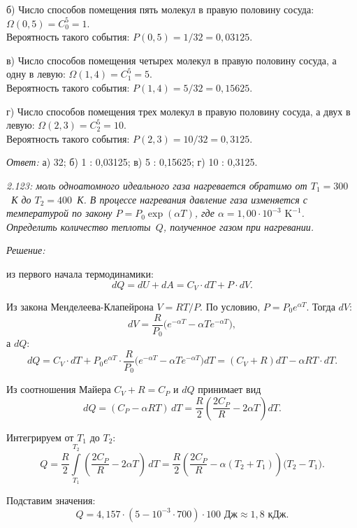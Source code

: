 \documentclass[pscyr]{hedwork}
\begin{document}
б) Число способов помещения пять молекул в правую половину сосуда:
\( \Omega(0, 5) = C_0^5 = 1 \).\\
Вероятность такого события: \( P(0, 5) = 1/32 = 0,\!03125 \).

в) Число способов помещения четырех молекул в правую половину сосуда, а одну в
левую: \( \Omega(1, 4) = C_1^5 = 5 \).\\
Вероятность такого события: \( P(1, 4) = 5/32 = 0,\!15625 \).

г) Число способов помещения трех молекул в правую половину сосуда, а двух в
левую: \( \Omega(2, 3) = C_2^5 = 10 \).\\
Вероятность такого события: \( P(2, 3) = 10/32 = 0,\!3125 \).

\vspace*{2em}
\emph{Ответ:} а) 32; б) 1 : 0,03125; в) 5 : 0,15625; г) 10 : 0,3125.

\newpage %

\emph{2.123: моль одноатомного идеального газа нагревается обратимо от
\( T_1 = 300 \)~К до \( T_2 = 400 \)~К. В процессе нагревания давление газа
изменяется с температурой по закону \( P = P_0 \exp(\alpha T) \), где
\( \alpha = 1,\!00 \cdot 10^{-3} \text{ K}^{-1} \). Определить количество
теплоты~\( Q \), полученное газом при нагревании.}

\vspace*{2em}
\emph{Решение:}

из первого начала термодинамики:
\[
  dQ = dU + dA = C_V\cdot dT + P\cdot dV.
\]

Из закона Менделеева-Клапейрона \( V = RT/P \). По условию,
\( P = P_0e^{\alpha T} \). Тогда \( dV \):
\[
  dV = \frac{R}{P_0} \Big( e^{-\alpha T} - \alpha Te^{-\alpha T} \Big),
\]
а \( dQ \):
\[
  dQ = C_V\cdot dT + P_0e^{\alpha T}\cdot \frac{R}{P_0}\Big( e^{-\alpha T} -
  \alpha Te^{-\alpha T} \Big)dT = (C_V + R)dT - \alpha RT\cdot dT.
\]

Из соотношения Майера \( C_V + R = C_P \) и \( dQ \) принимает вид
\[
  dQ = (C_P - \alpha RT)\,dT = \frac{R}{2}\left(\frac{2C_P}{R} -
  2\alpha T\right)dT.
\]

Интегрируем от \( T_1 \) до \( T_2 \):
\[
  Q = \frac{R}{2}\int\limits_{T_1}^{T_2} \left(\frac{2C_P}{R} -
  2\alpha T\right)\,dT = \frac{R}{2}\left(\frac{2C_P}{R} - \alpha
  (T_2 + T_1)\right)\bigg(T_2 - T_1\bigg).
\]

Подставим значения:
\[
  Q = 4,\!157\cdot(5 - 10^{-3}\cdot 700) \cdot 100 \text{ Дж} \approx 1,\!8
  \text{ кДж}.
\]
\end{document}
